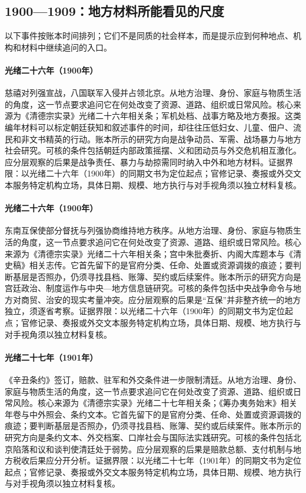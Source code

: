 \subsection{1900—1909：地方材料所能看见的尺度}
以下事件按账本时间排列；它们不是同质的社会样本，而是提示应到何种地点、机构和材料中继续追问的入口。
\hypertarget{social:EQ-1900-BOXER-WAR}{}\paragraph{光绪二十六年（1900年）}慈禧对列强宣战，八国联军入侵并占领北京。从地方治理、身份、家庭与物质生活的角度，这一节点要求追问它在何处改变了资源、道路、组织或日常风险。核心来源为《清德宗实录》光绪二十六年相关条；军机处档、战事方略及地方奏报。这类编年材料可以标定朝廷获知和叙述事件的时间，却往往压低妇女、儿童、佃户、流民和非文书精英的行动。账本所示的研究方向是战争动员、军需、战场暴力与地方社会研究。可核的条件包括朝廷内部政策摇摆、义和团动员与外交危机相互激化。应分层观察的后果是战争责任、暴力与劫掠需同时纳入中外和地方材料。证据界限：以光绪二十六年（1900年）的同期文书为定位起点；官修记录、奏报或外交文本服务特定机构立场，具体日期、规模、地方执行与对手视角须以独立材料复核。
\hypertarget{social:EQ-1900-SOUTHEAST-MUTUAL-PROTECTION}{}\paragraph{光绪二十六年（1900年）}东南互保使部分督抚与列强协商维持地方秩序。从地方治理、身份、家庭与物质生活的角度，这一节点要求追问它在何处改变了资源、道路、组织或日常风险。核心来源为《清德宗实录》光绪二十六年相关条；宫中朱批奏折、内阁大库题本与《清史稿》相关志传。它首先留下的是官府分类、任命、处置或资源调拨的痕迹；要判断基层是否照办，仍须寻找县档、账簿、契约或后续案件。账本所示的研究方向是宫廷政治、制度运作与中央—地方信息链研究。可核的条件包括中央战争命令与地方对商贸、治安的现实考量冲突。应分层观察的后果是“互保”并非整齐统一的地方独立，须逐省考察。证据界限：以光绪二十六年（1900年）的同期文书为定位起点；官修记录、奏报或外交文本服务特定机构立场，具体日期、规模、地方执行与对手视角须以独立材料复核。
\hypertarget{social:EQ-1901-BOXER-PROTOCOL}{}\paragraph{光绪二十七年（1901年）}《辛丑条约》签订，赔款、驻军和外交条件进一步限制清廷。从地方治理、身份、家庭与物质生活的角度，这一节点要求追问它在何处改变了资源、道路、组织或日常风险。核心来源为《清德宗实录》光绪二十七年相关条；《筹办夷务始末》相关年卷与中外照会、条约文本。它首先留下的是官府分类、任命、处置或资源调拨的痕迹；要判断基层是否照办，仍须寻找县档、账簿、契约或后续案件。账本所示的研究方向是条约文本、外交档案、口岸社会与国际法实践研究。可核的条件包括北京陷落和议和谈判使清廷处于弱势。应分层观察的后果是赔款总额、支付机制与地方税收后果应分开分析。证据界限：以光绪二十七年（1901年）的同期文书为定位起点；官修记录、奏报或外交文本服务特定机构立场，具体日期、规模、地方执行与对手视角须以独立材料复核。
